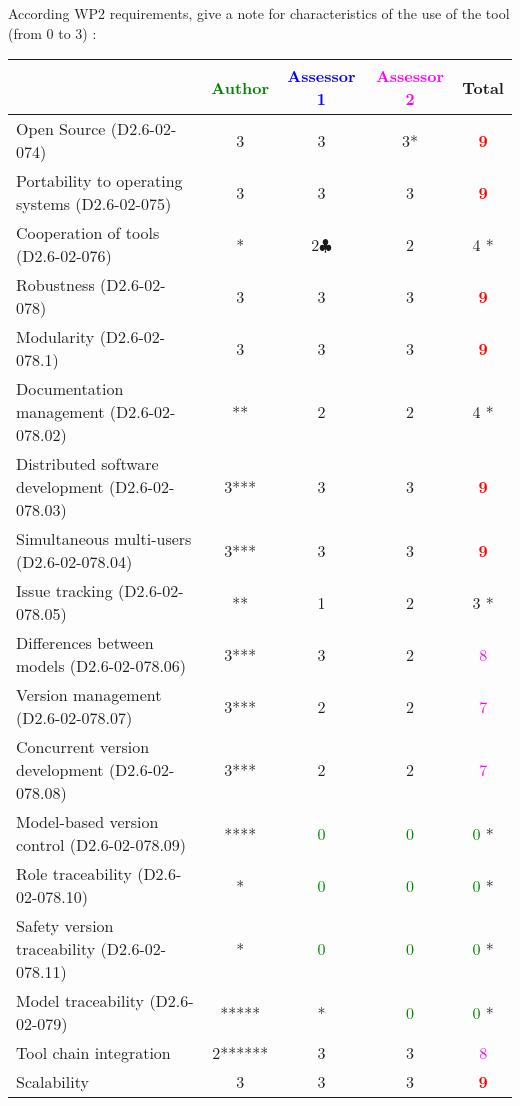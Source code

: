 According WP2 requirements, give a note for characteristics of the use of the tool (from 0 to 3) :

\begin{tabular}{|l | c | c | c | c|}
\hline
& \textcolor{green}{Author} & \textcolor{blue}{Assessor 1} & \textcolor{magenta}{Assessor 2} & Total \\
\hline
Open Source (D2.6-02-074) &3 &3 &3* & \textcolor{red}{\textbf{9}} \\
\hline
Portability to operating systems (D2.6-02-075) &3 &3 &3 & \textcolor{red}{\textbf{9}} \\
\hline
Cooperation of tools (D2.6-02-076) &* &2$\clubsuit$ &2 & 4   * \\
\hline
Robustness (D2.6-02-078) &3 &3 &3 & \textcolor{red}{\textbf{9}} \\
\hline
Modularity (D2.6-02-078.1) &3 &3 &3 & \textcolor{red}{\textbf{9}} \\
\hline
Documentation management (D2.6-02-078.02) &** &2 &2 & 4   * \\
\hline
Distributed software development (D2.6-02-078.03) &3*** &3 &3 & \textcolor{red}{\textbf{9}} \\
\hline
Simultaneous multi-users (D2.6-02-078.04) &3*** & 3   &3 & \textcolor{red}{\textbf{9}} \\
\hline
Issue tracking (D2.6-02-078.05) &** &1 &2 & 3   * \\
\hline
Differences between models (D2.6-02-078.06) &3*** &3 &2 & \textcolor{magenta}{8} \\
\hline
Version management (D2.6-02-078.07) &3*** &2 &2 & \textcolor{magenta}{7} \\
\hline
Concurrent version development (D2.6-02-078.08) &3*** &2 &2 & \textcolor{magenta}{7} \\
\hline
Model-based version control (D2.6-02-078.09) &**** & \textcolor{green}{0}   & \textcolor{green}{0}   & \textcolor{green}{0} * \\
\hline
Role traceability (D2.6-02-078.10) &* & \textcolor{green}{0}   & \textcolor{green}{0}   & \textcolor{green}{0} * \\
\hline
Safety version traceability (D2.6-02-078.11) &* & \textcolor{green}{0}   & \textcolor{green}{0}   & \textcolor{green}{0} * \\
\hline
Model traceability (D2.6-02-079) &***** & * & \textcolor{green}{0}   & \textcolor{green}{0} * \\
\hline
Tool chain integration &2****** &3 &3 & \textcolor{magenta}{8} \\
\hline
Scalability &3 &3 &3 & \textcolor{red}{\textbf{9}} \\
\hline
\end{tabular}

